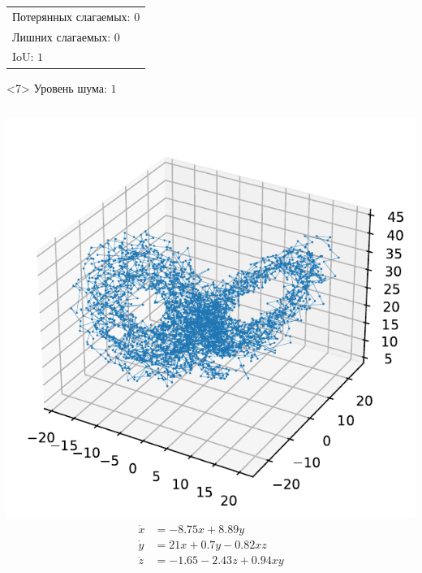 \documentclass[pdf, hyperref={unicode}, aspectratio=169]{beamer}
\begin{document}
\begin{frame}
\begin{onlyenv}
\begin{columns}
\end{columns}
\vfill
\begin{center}
  \begin{tabular}{l}
  Потерянных слагаемых: $0$\\
  Лишних слагаемых: $0$\\
  IoU: $1$\\
  \end{tabular}
\end{center}
\end{onlyenv}

\begin{onlyenv}<7>
Уровень шума: $1$
\vfill
\begin{columns}
  \includegraphics[height=\linewidth]{img/ex4_orig}
  \begin{align*}
  \dot{x} &= -8.75 x + 8.89 y \\
  \dot{y} &= 21 x + 0.7 y - 0.82 x z \\
  \dot{z} &= -1.65 - 2.43 z + 0.94 x y
  \end{align*}

\end{columns}
\end{onlyenv}
\end{frame}
\end{document}
